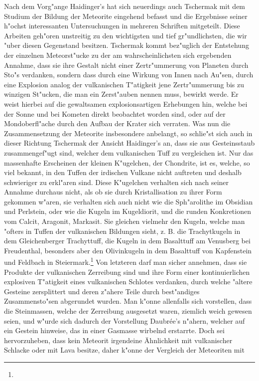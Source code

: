 \documentclass[a4paper, 11pt, oneside]{article}
\begin{document}
Nach dem Vorg"ange Haidinger's hat sich neuerdings auch Tschermak mit dem Studium der Bildung der Meteorite eingehend befasst und die Ergebnisse seiner h"ochst interessanten Untersuchungen in mehreren Schriften mitgeteilt. Diese Arbeiten geh"oren unstreitig zu den wichtigsten und tief gr"undlichsten, die wir "uber diesen Gegenstand besitzen. Tschermak kommt bez"uglich der Entstehung der einzelnen Meteorst"ucke zu der am wahrscheinlichsten sich ergebenden Annahme, dass sie ihre Gestalt nicht einer Zertr"ummerung von Planeten durch Sto"s verdanken, sondern dass durch eine Wirkung von Innen nach Au"sen, durch eine Explosion analog der vulkanischen T"atigkeit jene Zertr"ummerung bis zu winzigen St"ucken, die man ein Zerst"auben nennen muss, bewirkt werde. Er weist hierbei auf die gewaltsamen explosionsartigen Erhebungen hin, welche bei der Sonne und bei Kometen direkt beobachtet worden sind, oder auf der Mondoberfl"ache durch den Aufbau der Krater sich verraten. Was nun die Zusammensetzung der Meteorite insbesondere anbelangt, so schlie"st sich auch in dieser Richtung Tschermak der Ansicht Haidinger's an, dass sie aus Gesteinsstaub zusammengef"ugt sind, welcher dem vulkanischen Tuff zu vergleichen ist. Nur das massenhafte Erscheinen der kleinen K"ugelchen, der Chondrite, ist es, welche, so viel bekannt, in den Tuffen der irdischen Vulkane nicht auftreten und deshalb schwieriger zu erkl"aren sind. Diese K"ugelchen verhalten sich nach seiner Annahme durchaus nicht, als ob sie durch Kristallisation zu ihrer Form gekommen w"aren, sie verhalten sich auch nicht wie die Sph"arolithe im Obsidian und Perlstein, oder wie die Kugeln im Kugeldiorit, und die runden Konkretionen vom Calcit, Aragonit, Markasit. Sie gleichen vielmehr den Kugeln, welche man "ofters in Tuffen der vulkanischen Bildungen sieht, z. B. die Trachytkugeln in dem Gleichenberger Trachyttuff, die Kugeln in dem Basalttuff am Venusberg bei Freudenthal, besonders aber den Olivinkugeln in dem Basalttuff von Kapfenstein und Feldbach in Steiermark.\footnote{} Von letzteren darf man sicher annehmen, dass sie Produkte der vulkanischen Zerreibung sind und ihre Form einer kontinuierlichen explosiven T"atigkeit eines vulkanischen Schlotes verdanken, durch welche "altere Gesteine zersplittert und deren z"ahere Teile durch best"andiges Zusammensto"sen abgerundet wurden. Man k"onne allenfalls sich vorstellen, dass die Steinmassen, welche der Zerreibung ausgesetzt waren, ziemlich weich gewesen seien, und w"urde sich dadurch der Vorstellung Daubrée's n"ahern, welcher auf ein Gestein hinweise, das in einer Gasmasse wirbelnd erstarrte. Doch sei hervorzuheben, dass kein Meteorit irgendeine Ähnlichkeit mit vulkanischer Schlacke oder mit Lava besitze, daher k"onne der Vergleich der Meteoriten mit 
\end{document}
